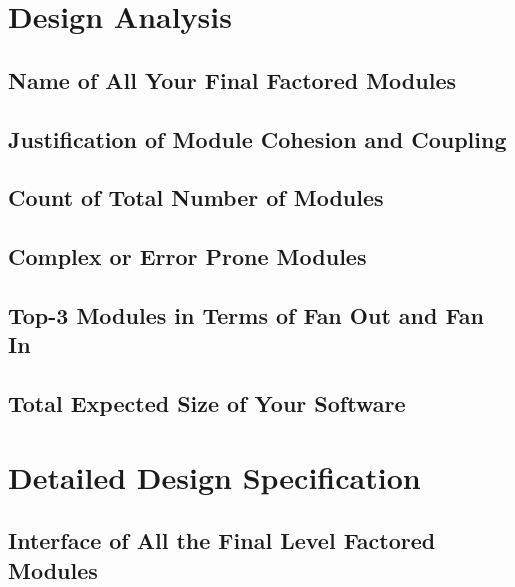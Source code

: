\documentclass{article}
\begin{document}
\section{Design Analysis}
\subsection{Name of All Your Final Factored Modules}

\subsection{Justification of Module Cohesion and Coupling}

\subsection{Count of Total Number of Modules}

\subsection{Complex or Error Prone Modules}

\subsection{Top-3 Modules in Terms of Fan Out and Fan In}

\subsection{Total Expected Size of Your Software}

\section{Detailed Design Specification}
\subsection{Interface of All the Final Level Factored Modules}
\end{document}

